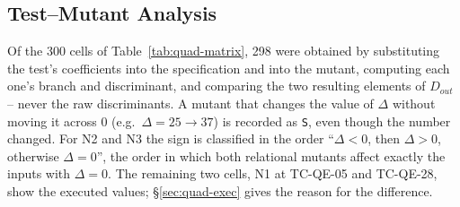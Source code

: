 \documentclass[11pt,a4paper]{article}
\begin{document}
\subsection{Test--Mutant Analysis}
\label{sec:quad-matrix}

Of the 300 cells of Table~\ref{tab:quad-matrix}, 298 were obtained by substituting the
test's coefficients into the specification and into the mutant, computing
each one's branch and discriminant, and comparing the two resulting elements
of \(D_{out}\) -- never the raw discriminants. A mutant that changes the value
of \(\Delta\) without moving it across \(0\) (e.g.\ \(\Delta=25\to37\)) is
recorded as \texttt{S}, even though the number changed. For N2 and N3 the
sign is classified in the order ``\(\Delta<0\), then \(\Delta>0\),
otherwise \(\Delta=0\)'', the order in which both relational mutants affect
exactly the inputs with \(\Delta=0\). The remaining two cells, N1 at TC-QE-05 and TC-QE-28, show the executed values; \S\ref{sec:quad-exec} gives the reason for the difference.
\end{document}
